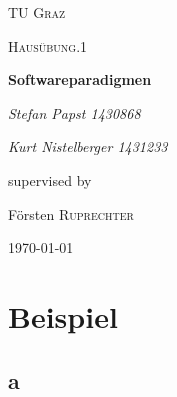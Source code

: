 \documentclass[a4paper, 11pt]{article}
\begin{document}
\begin{titlepage}
	\centering
	{\scshape\LARGE TU Graz \par}
	\vspace{1cm}
	{\scshape\Large Hausübung.1\par}
	\vspace{1.5cm}
	{\huge\bfseries Softwareparadigmen\par}
	\vspace{2cm}
	{\Large\itshape Stefan Papst 1430868\par}
	{\Large\itshape Kurt Nistelberger 1431233\par}
	\vfill
	supervised by\par
	Försten \textsc{Ruprechter}

	\vfill

	{\large \today\par}
\end{titlepage}

%
%


\tableofcontents
\newpage


\section{Beispiel}
\subsection{a}
\end{document}
